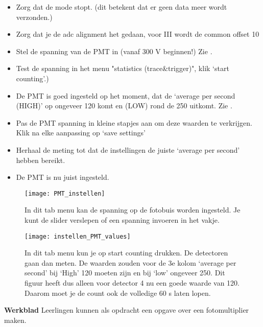 \begin{itemize}
    \item Zorg dat de \daq mode stopt. (dit betekent dat er geen data meer wordt verzonden.)
    \item Zorg dat je de adc alignment het gedaan, voor \hisparc III \daq wordt de common offset
    10
    \item Stel de spanning van de PMT in (vanaf 300 V beginnen!) Zie .
    \item Test de spanning in het menu "statistics (trace\&trigger)", klik `start counting'.)
    \item De PMT is goed ingesteld op het moment, dat de `average per second (HIGH)' 
    op ongeveer 120 komt en (LOW) rond de 250 uitkomt. Zie .
    \item Pas de PMT spanning in kleine stapjes aan om deze waarden te verkrijgen. Klik na elke aanpassing op `save settings'
    \item Herhaal de meting tot dat de instellingen de juiste `average per second' hebben bereikt.
    \item De PMT is nu juist ingesteld.
\end{itemize}

\begin{figure}
    \centering
    \texttt{[image: PMT\_instellen]}
    \caption{In dit tab menu kan de spanning op de fotobuis worden ingesteld.
    Je kunt de slider verslepen of een spanning invoeren in het vakje.}
    \label{fig:PMT_instellen}
\end{figure}

\begin{figure}
    \centering
    \texttt{[image: instellen\_PMT\_values]}
    \caption{In dit tab menu kun je op start counting drukken. De detectoren gaan dan meten.
    De waarden zouden voor de 3e kolom `average per second' bij `High' 120 moeten zijn en bij `low' ongeveer 250.
    Dit figuur heeft dus alleen voor detector 4 nu een goede waarde van 120.
    Daarom moet je de count ook de volledige 60 s laten lopen.}
    \label{fig:instellen_PMT_values}

\end{figure}

\textbf{Werkblad}
Leerlingen kunnen als opdracht een opgave over een fotomultiplier maken.








